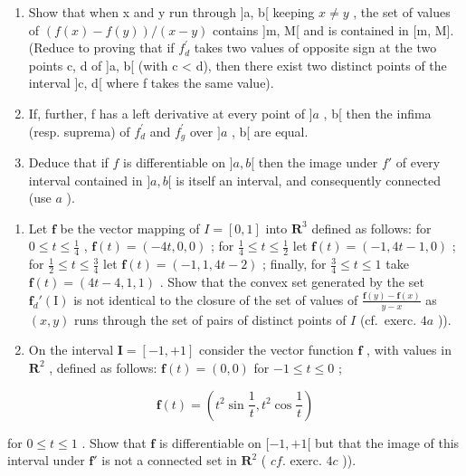 \begin{enumerate}
\def\labelenumi{\alph{enumi})}
\item
  Show that when x and y run through {]}a, b{[} keeping \(x \neq y\) , the set of values of \((f(x) - f(y))/(x - y)\) contains {]}m, M{[} and is contained in {[}m, M{]}. (Reduce to proving that if \(f_{d}^{\prime}\) takes two values of opposite sign at the two points c, d of {]}a, b{[} (with c \textless{} d), then there exist two distinct points of the interval {]}c, d{[} where f takes the same value).
\item
  If, further, f has a left derivative at every point of \(]a\) , b{[} then the infima (resp. suprema) of \(f_{d}^{\prime}\) and \(f_{g}^{\prime}\) over \(]a\) , b{[} are equal.
\item
  Deduce that if \(f\) is differentiable on \(]a, b[\) then the image under \(f'\) of every interval contained in \(]a, b[\) is itself an interval, and consequently connected (use \(a\) ).
\end{enumerate}

\begin{enumerate}
\def\labelenumi{\arabic{enumi})}
\setcounter{enumi}{4}
\item
  Let \(\mathbf{f}\) be the vector mapping of \(I = [0, 1]\) into \(\mathbf{R}^3\) defined as follows: for \(0 \leqslant t \leqslant \frac{1}{4}\) , \(\mathbf{f}(t) = (-4t, 0, 0)\) ; for \(\frac{1}{4} \leqslant t \leqslant \frac{1}{2}\) let \(\mathbf{f}(t) = (-1, 4t - 1, 0)\) ; for \(\frac{1}{2} \leqslant t \leqslant \frac{3}{4}\) let \(\mathbf{f}(t) = (-1, 1, 4t - 2)\) ; finally, for \(\frac{3}{4} \leqslant t \leqslant 1\) take \(\mathbf{f}(t) = (4t - 4, 1, 1)\) . Show that the convex set generated by the set \(\mathbf{f}_d'(\mathrm{I})\) is not identical to the closure of the set of values of \(\frac{\mathbf{f}(y) - \mathbf{f}(x)}{y - x}\) as \((x, y)\) runs through the set of pairs of distinct points of \(I\) (cf.~exerc. \(4a\) )).
\item
  On the interval \(\mathbf{I} = [-1, + 1]\) consider the vector function \(\mathbf{f}\) , with values in \(\mathbf{R}^2\) , defined as follows: \(\mathbf{f}(t) = (0,0)\) for \(-1\leqslant t\leqslant 0\) ;
\end{enumerate}

\[
\mathbf {f} (t) = \left(t ^ {2} \sin \frac {1}{t}, t ^ {2} \cos \frac {1}{t}\right)
\]

for \(0 \leqslant t \leqslant 1\) . Show that \(\mathbf{f}\) is differentiable on \([-1, +1[\) but that the image of this interval under \(\mathbf{f}'\) is not a connected set in \(\mathbf{R}^2\) ( \(cf.\) exerc. \(4c\) )).

